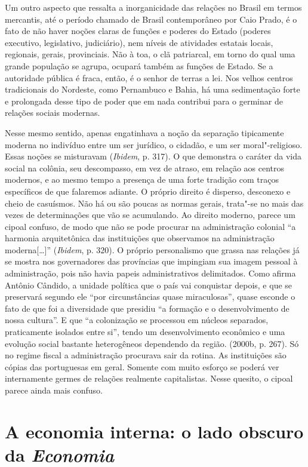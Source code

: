 Um outro aspecto que ressalta a inorganicidade das relações no Brasil em
termos mercantis, até o período chamado de Brasil contemporâneo por Caio
Prado, é o fato de não haver noções claras de funções e poderes do
Estado (poderes executivo, legislativo, judiciário), nem níveis de
atividades estatais locais, regionais, gerais, provinciais. Não à toa, o
clã patriarcal, em torno do qual uma grande população se agrupa, ocupará
também as funções de Estado. Se a autoridade pública é fraca, então, é o
senhor de terras a lei. Nos velhos centros tradicionais do Nordeste,
como Pernambuco e Bahia, há uma sedimentação forte e prolongada desse
tipo de poder que em nada contribui para o germinar de relações sociais
modernas.

Nesse mesmo sentido, apenas engatinhava a noção da separação tipicamente
moderna no indivíduo entre um ser jurídico, o cidadão, e um ser
moral"-religioso. Essas noções se misturavam (\emph{Ibidem}, p. 317). O
que demonstra o caráter da vida social na colônia, seu descompasso, em
vez de atraso, em relação aos centros modernos, e ao mesmo tempo a
presença de uma forte tradição com traços específicos de que falaremos
adiante. O próprio direito é disperso, desconexo e cheio de casuísmos.
Não há ou são poucas as normas gerais, trata"-se no mais das vezes de
determinações que vão se acumulando. Ao direito moderno, parece um
cipoal confuso, de modo que não se pode procurar na administração
colonial ``a harmonia arquitetônica das instituições que observamos na
administração moderna[\ldots{}]'' (\emph{Ibidem}, p. 320). O próprio
personalismo que grassa nas relações já se mostra nos governadores das
províncias que impingiam sua imagem pessoal à administração, pois não
havia papeis administrativos delimitados. Como afirma Antônio Cândido, a
unidade política que o país vai conquistar depois, e que se preservará
segundo ele ``por circunstâncias quase miraculosas'', quase esconde o
fato de que foi a diversidade que presidiu ``a formação e o
desenvolvimento de nossa cultura''. E que ``a colonização se processou
em núcleos separados, praticamente isolados entre si'', tendo um
desenvolvimento econômico e uma evolução social bastante heterogêneos
dependendo da região. (2000b, p. 267). Só no regime fiscal a
administração procurava sair da rotina. As instituições são cópias das
portuguesas em geral. Somente com muito esforço se poderá ver
internamente germes de relações realmente capitalistas. Nesse quesito, o
cipoal parece ainda mais confuso.

\section{A economia interna: o lado obscuro da \emph{Economia}}

